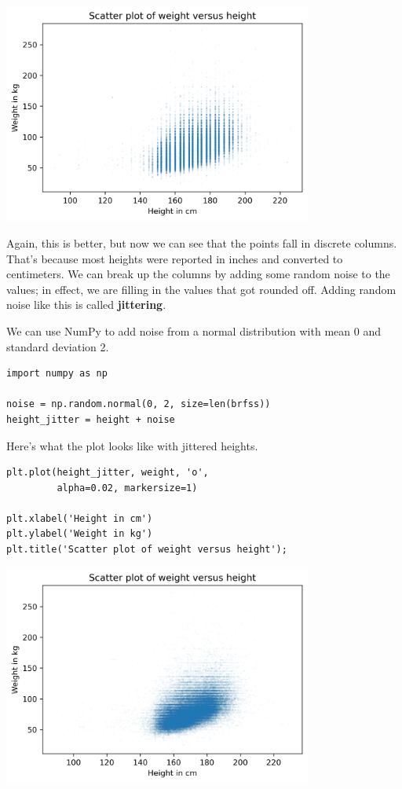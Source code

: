 \begin{center}
\includegraphics[width=4in]{chapters/09_relationships_files/09_relationships_17_0.png}
\end{center}

Again, this is better, but now we can see that the points fall in
discrete columns. That's because most heights were reported in inches
and converted to centimeters. We can break up the columns by adding some
random noise to the values; in effect, we are filling in the values that
got rounded off. Adding random noise like this is called
\textbf{jittering}.

We can use NumPy to add noise from a normal distribution with mean 0 and
standard deviation 2.

\begin{lstlisting}[]
import numpy as np

noise = np.random.normal(0, 2, size=len(brfss))
height_jitter = height + noise
\end{lstlisting}

Here's what the plot looks like with jittered heights.

\begin{lstlisting}[]
plt.plot(height_jitter, weight, 'o', 
         alpha=0.02, markersize=1)

plt.xlabel('Height in cm')
plt.ylabel('Weight in kg')
plt.title('Scatter plot of weight versus height');
\end{lstlisting}

\begin{center}
\includegraphics[width=4in]{chapters/09_relationships_files/09_relationships_21_0.png}
\end{center}

